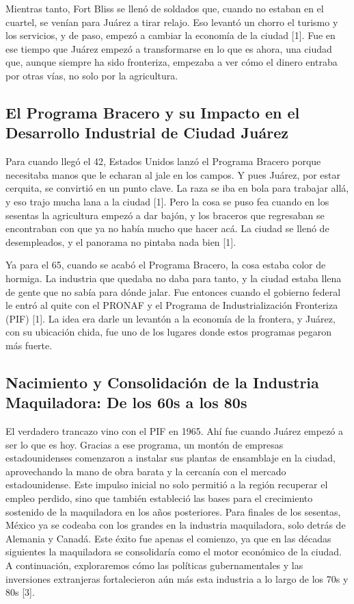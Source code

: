 \documentclass[
  10pt,
  letterpaper,
]{book}
\begin{document}
Mientras tanto, Fort Bliss se llenó de soldados que, cuando no estaban
en el cuartel, se venían para Juárez a tirar relajo. Eso levantó un
chorro el turismo y los servicios, y de paso, empezó a cambiar la
economía de la ciudad {[}1{]}. Fue en ese tiempo que Juárez empezó a
transformarse en lo que es ahora, una ciudad que, aunque siempre ha sido
fronteriza, empezaba a ver cómo el dinero entraba por otras vías, no
solo por la agricultura.

\subsection{El Programa Bracero y su Impacto en el Desarrollo Industrial
de Ciudad
Juárez}\label{el-programa-bracero-y-su-impacto-en-el-desarrollo-industrial-de-ciudad-juuxe1rez}

Para cuando llegó el 42, Estados Unidos lanzó el Programa Bracero porque
necesitaba manos que le echaran al jale en los campos. Y pues Juárez,
por estar cerquita, se convirtió en un punto clave. La raza se iba en
bola para trabajar allá, y eso trajo mucha lana a la ciudad {[}1{]}.
Pero la cosa se puso fea cuando en los sesentas la agricultura empezó a
dar bajón, y los braceros que regresaban se encontraban con que ya no
había mucho que hacer acá. La ciudad se llenó de desempleados, y el
panorama no pintaba nada bien {[}1{]}.

Ya para el 65, cuando se acabó el Programa Bracero, la cosa estaba color
de hormiga. La industria que quedaba no daba para tanto, y la ciudad
estaba llena de gente que no sabía para dónde jalar. Fue entonces cuando
el gobierno federal le entró al quite con el PRONAF y el Programa de
Industrialización Fronteriza (PIF) {[}1{]}. La idea era darle un
levantón a la economía de la frontera, y Juárez, con su ubicación chida,
fue uno de los lugares donde estos programas pegaron más fuerte.

\subsection{Nacimiento y Consolidación de la Industria Maquiladora: De
los 60s a los
80s}\label{nacimiento-y-consolidaciuxf3n-de-la-industria-maquiladora-de-los-60s-a-los-80s}

El verdadero trancazo vino con el PIF en 1965. Ahí fue cuando Juárez
empezó a ser lo que es hoy. Gracias a ese programa, un montón de
empresas estadounidenses comenzaron a instalar sus plantas de ensamblaje
en la ciudad, aprovechando la mano de obra barata y la cercanía con el
mercado estadounidense. Este impulso inicial no solo permitió a la
región recuperar el empleo perdido, sino que también estableció las
bases para el crecimiento sostenido de la maquiladora en los años
posteriores. Para finales de los sesentas, México ya se codeaba con los
grandes en la industria maquiladora, solo detrás de Alemania y Canadá.
Este éxito fue apenas el comienzo, ya que en las décadas siguientes la
maquiladora se consolidaría como el motor económico de la ciudad. A
continuación, exploraremos cómo las políticas gubernamentales y las
inversiones extranjeras fortalecieron aún más esta industria a lo largo
de los 70s y 80s {[}3{]}.
\end{document}
